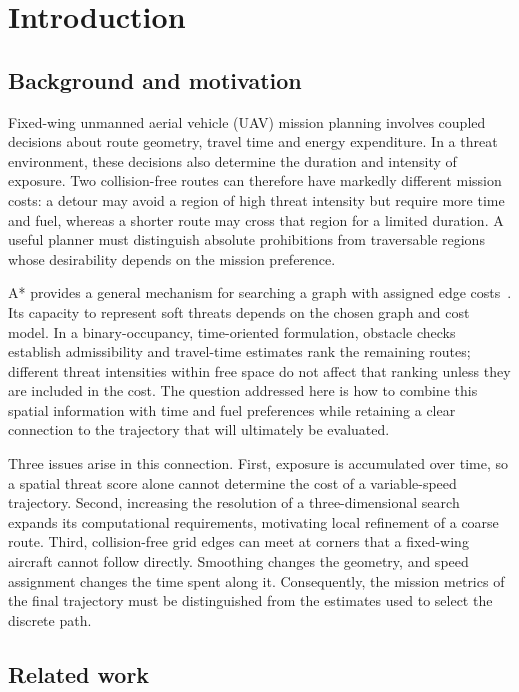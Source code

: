 \section{Introduction}
\label{sec:introduction}

\subsection{Background and motivation}
\label{sec:motivation}

Fixed-wing unmanned aerial vehicle (UAV) mission planning involves coupled
decisions about route geometry, travel time and energy expenditure. In a
threat environment, these decisions also determine the duration and
intensity of exposure. Two collision-free routes can therefore have markedly
different mission costs: a detour may avoid a region of high threat intensity
but require more time and fuel, whereas a shorter route may cross that
region for a limited duration. A useful planner must distinguish absolute
prohibitions from traversable regions whose desirability depends on the
mission preference.

A* provides a general mechanism for searching a graph with assigned edge
costs~\cite{hart1968}. Its capacity to represent soft threats depends on the
chosen graph and cost model. In a binary-occupancy, time-oriented formulation,
obstacle checks establish admissibility and travel-time estimates rank the
remaining routes; different threat intensities within free space do not
affect that ranking unless they are included in the cost. The question
addressed here is how to combine this spatial information with time and
fuel preferences while retaining a clear connection to the trajectory
that will ultimately be evaluated.

Three issues arise in this connection. First, exposure is accumulated over
time, so a spatial threat score alone cannot determine the cost of a
variable-speed trajectory. Second, increasing the resolution of a
three-dimensional search expands its computational requirements, motivating
local refinement of a coarse route. Third, collision-free grid edges can
meet at corners that a fixed-wing aircraft cannot follow directly.
Smoothing changes the geometry, and speed assignment changes the time spent
along it. Consequently, the mission metrics of the final trajectory must
be distinguished from the estimates used to select the discrete path.

\subsection{Related work}
\label{sec:related_work}

